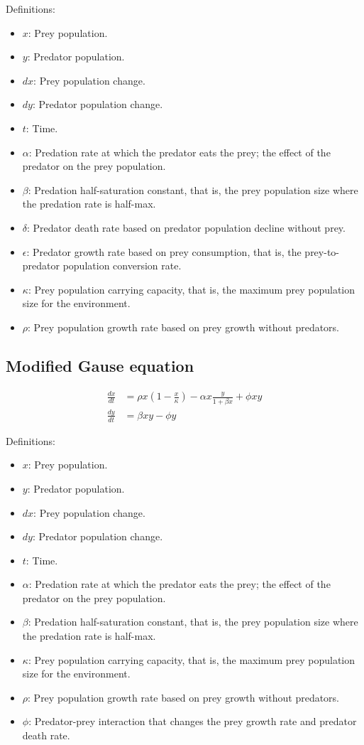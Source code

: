 Definitions:
\begin{itemize}
\item $x$: Prey population.
\item $y$: Predator population.
\item $dx$: Prey population change.
\item $dy$: Predator population change.
\item $t$: Time.
\item $\alpha$: Predation rate at which the predator eats the prey; the effect of the predator on the prey population.
\item $\beta$: Predation half-saturation constant, that is, the prey population size where the predation rate is half-max.
\item $\delta$: Predator death rate based on predator population decline without prey.
\item $\epsilon$: Predator growth rate based on prey consumption, that is, the prey-to-predator population conversion rate.
\item $\kappa$: Prey population carrying capacity, that is, the maximum prey population size for the environment.
\item $\rho$: Prey population growth rate based on prey growth without predators.
\end{itemize}

\subsection{Modified Gause equation}
\begin{equation*}
\begin{split}
\frac{dx}{dt} &= \rho x \left(1 - \frac{x}{\kappa}\right) - \alpha x \frac{y}{1 + \beta x} + \phi x y \\
\frac{dy}{dt} &= \beta x y - \phi y
\end{split}
\end{equation*}

Definitions:
\begin{itemize}
\item $x$: Prey population.
\item $y$: Predator population.
\item $dx$: Prey population change.
\item $dy$: Predator population change.
\item $t$: Time.
\item $\alpha$: Predation rate at which the predator eats the prey; the effect of the predator on the prey population.
\item $\beta$: Predation half-saturation constant, that is, the prey population size where the predation rate is half-max.
\item $\kappa$: Prey population carrying capacity, that is, the maximum prey population size for the environment.
\item $\rho$: Prey population growth rate based on prey growth without predators.
\item $\phi$: Predator-prey interaction that changes the prey growth rate and predator death rate.
\end{itemize}

